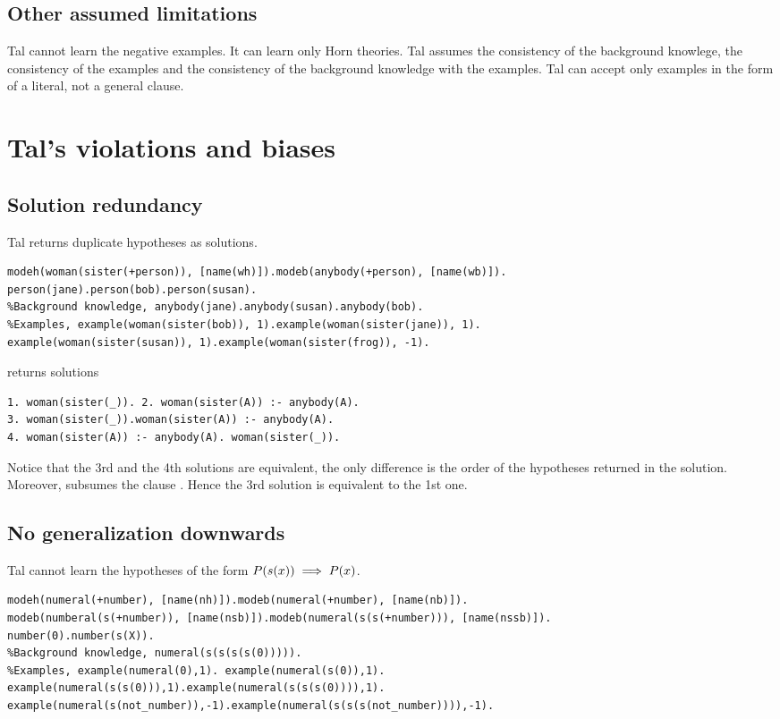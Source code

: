 \subsection{Other assumed limitations}
Tal cannot learn the negative examples. It can learn only Horn theories. Tal assumes the consistency of the background knowlege, the consistency of the examples and the consistency of the background knowledge with the examples. Tal can accept only examples in the form of a literal, not a general clause.

\section{Tal's violations and biases}

\subsection{Solution redundancy}
Tal returns duplicate hypotheses as solutions.
\begin{lstlisting}
modeh(woman(sister(+person)), [name(wh)]).modeb(anybody(+person), [name(wb)]).
person(jane).person(bob).person(susan).
%Background knowledge, anybody(jane).anybody(susan).anybody(bob).
%Examples, example(woman(sister(bob)), 1).example(woman(sister(jane)), 1).
example(woman(sister(susan)), 1).example(woman(sister(frog)), -1).
\end{lstlisting}
returns solutions
\begin{lstlisting}
1. woman(sister(_)). 2. woman(sister(A)) :- anybody(A).
3. woman(sister(_)).woman(sister(A)) :- anybody(A).
4. woman(sister(A)) :- anybody(A). woman(sister(_)).
\end{lstlisting}
Notice that the 3rd and the 4th solutions are equivalent, the only difference is the order of the hypotheses returned in the solution.  Moreover,  subsumes the clause . Hence the 3rd solution is equivalent to the 1st one.

\subsection{No generalization downwards}
Tal cannot learn the hypotheses of the form $P(s(x)) \implies P (x)$.
\begin{lstlisting}
modeh(numeral(+number), [name(nh)]).modeb(numeral(+number), [name(nb)]).
modeb(numberal(s(+number)), [name(nsb)]).modeb(numeral(s(s(+number))), [name(nssb)]).
number(0).number(s(X)).
%Background knowledge, numeral(s(s(s(s(0))))).
%Examples, example(numeral(0),1). example(numeral(s(0)),1). 
example(numeral(s(s(0))),1).example(numeral(s(s(s(0)))),1).
example(numeral(s(not_number)),-1).example(numeral(s(s(s(not_number)))),-1).
\end{lstlisting}

